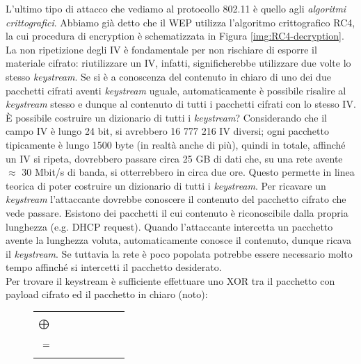L'ultimo tipo di attacco che vediamo al protocollo 802.11 è quello agli \textit{algoritmi crittografici}. Abbiamo già detto che il WEP utilizza l'algoritmo crittografico RC4, la cui procedura di encryption è schematizzata in Figura \ref{img:RC4-decryption}. La non ripetizione degli IV è fondamentale per non rischiare di esporre il materiale cifrato: riutilizzare un IV, infatti, significherebbe utilizzare due volte lo stesso \textit{keystream}. Se si è a conoscenza del contenuto in chiaro di uno dei due pacchetti cifrati aventi \textit{keystream} uguale, automaticamente è possibile risalire al \textit{keystream} stesso e dunque al contenuto di tutti i pacchetti cifrati con lo stesso IV. È possibile costruire un dizionario di tutti i \textit{keystream}? Considerando che il campo IV è lungo 24 bit, si avrebbero 16 777 216 IV diversi; ogni pacchetto tipicamente è lungo 1500 byte (in realtà anche di più), quindi in totale, affinché un IV si ripeta, dovrebbero passare circa 25 GB di dati che, su una rete avente $\approx$ 30 Mbit/s di banda, si otterrebbero in circa due ore. Questo permette in linea teorica di poter costruire un dizionario di tutti i \textit{keystream}. Per ricavare un \textit{keystream} l'attaccante dovrebbe conoscere il contenuto del pacchetto cifrato che vede passare. Esistono dei pacchetti il cui contenuto è riconoscibile dalla propria lunghezza (e.g. DHCP request). Quando l'attaccante intercetta un pacchetto avente la lunghezza voluta, automaticamente conosce il contenuto, dunque ricava il \textit{keystream}. Se tuttavia la rete è poco popolata potrebbe essere necessario molto tempo affinché si intercetti il pacchetto desiderato.\\
Per trovare il keystream è sufficiente effettuare uno XOR tra il pacchetto con payload cifrato ed il pacchetto in chiaro (noto):
\begin{figure}[htbp]
	\centering
	\begin{tabular}{r}
		{\begin{bytefield}{24}\bitbox{8}{Header}\bitbox{16}{Payload cifrato}\end{bytefield}}\\
		$\bigoplus\hspace{2.5cm}$\\
		{\begin{bytefield}{16}\bitbox{16}{Pacchetto in chiaro (noto)}\end{bytefield}}\\
		$=\hspace{2.5cm}$\\
		{\begin{bytefield}{16}\bitbox{16}{Keystream}\end{bytefield}}\\
	\end{tabular}
\end{figure}\\
